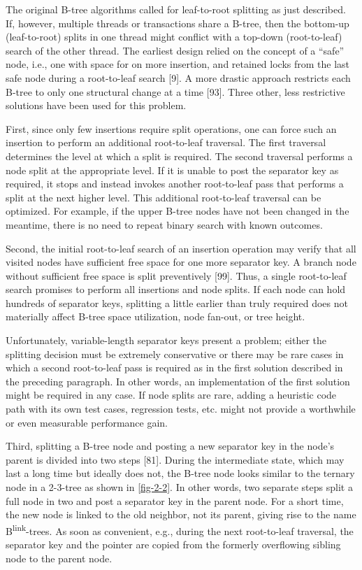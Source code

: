 The original B-tree algorithms called for leaf-to-root splitting as just
described. If, however, multiple threads or transactions share a B-tree,
then the bottom-up (leaf-to-root) splits in one thread might conflict
with a top-down (root-to-leaf) search of the other thread. The earliest
design relied on the concept of a ``safe'' node, i.e., one with space
for on more insertion, and retained locks from the last safe node during
a root-to-leaf search {[}9{]}. A more drastic approach restricts each
B-tree to only one structural change at a time {[}93{]}. Three other,
less restrictive solutions have been used for this problem.

First, since only few insertions require split operations, one can force
such an insertion to perform an additional root-to-leaf traversal. The
first traversal determines the level at which a split is required. The
second traversal performs a node split at the appropriate level. If it
is unable to post the separator key as required, it stops and instead
invokes another root-to-leaf pass that performs a split at the next
higher level. This additional root-to-leaf traversal can be optimized.
For example, if the upper B-tree nodes have not been changed in the
meantime, there is no need to repeat binary search with known outcomes.

Second, the initial root-to-leaf search of an insertion operation may
verify that all visited nodes have sufficient free space for one more
separator key. A branch node without sufficient free space is split
preventively {[}99{]}. Thus, a single root-to-leaf search promises to
perform all insertions and node splits. If each node can hold hundreds
of separator keys, splitting a little earlier than truly required does
not materially affect B-tree space utilization, node fan-out, or tree
height.

Unfortunately, variable-length separator keys present a problem; either
the splitting decision must be extremely conservative or there may be
rare cases in which a second root-to-leaf pass is required as in the
first solution described in the preceding paragraph. In other words, an
implementation of the first solution might be required in any case. If
node splits are rare, adding a heuristic code path with its own test
cases, regression tests, etc. might not provide a worthwhile or even
measurable performance gain.

Third, splitting a B-tree node and posting a new separator key in the
node's parent is divided into two steps {[}81{]}. During the
intermediate state, which may last a long time but ideally does not, the
B-tree node looks similar to the ternary node in a 2-3-tree as shown in
\autoref{fig-2-2}. In other words, two separate steps split a full node in two
and post a separator key in the parent node. For a short time, the new
node is linked to the old neighbor, not its parent, giving rise to the
name B\textsuperscript{link}-trees. As soon as convenient, e.g., during
the next root-to-leaf traversal, the separator key and the pointer are
copied from the formerly overflowing sibling node to the parent node.

